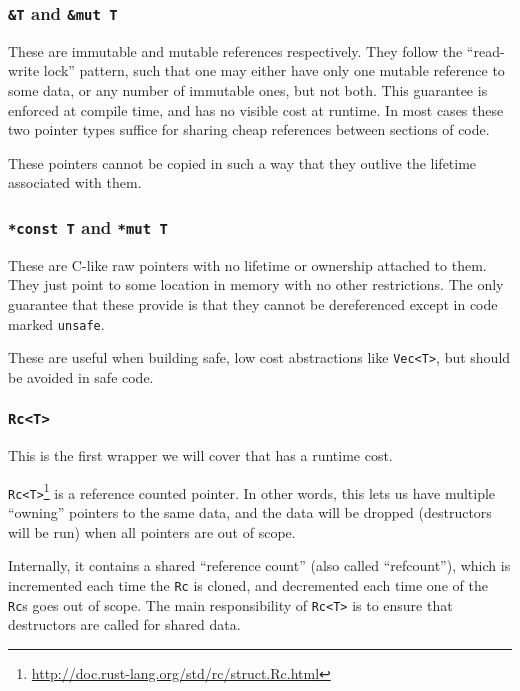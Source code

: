 \documentclass[a4paper,]{book}
\renewcommand{\href}[2]{#2\footnote{\url{#1}}}
\begin{document}
\subsubsection{\texorpdfstring{\texttt{\&T} and
\texttt{\&mut\ T}}{\&T and \&mut T}}\label{t-and-mut-t}

These are immutable and mutable references respectively. They follow the
``read-write lock'' pattern, such that one may either have only one
mutable reference to some data, or any number of immutable ones, but not
both. This guarantee is enforced at compile time, and has no visible
cost at runtime. In most cases these two pointer types suffice for
sharing cheap references between sections of code.

These pointers cannot be copied in such a way that they outlive the
lifetime associated with them.

\subsubsection{\texorpdfstring{\texttt{*const\ T} and
\texttt{*mut\ T}}{*const T and *mut T}}\label{const-t-and-mut-t}

These are C-like raw pointers with no lifetime or ownership attached to
them. They just point to some location in memory with no other
restrictions. The only guarantee that these provide is that they cannot
be dereferenced except in code marked \texttt{unsafe}.

These are useful when building safe, low cost abstractions like
\texttt{Vec\textless{}T\textgreater{}}, but should be avoided in safe
code.

\subsubsection{\texorpdfstring{\texttt{Rc\textless{}T\textgreater{}}}{Rc\textless{}T\textgreater{}}}\label{rct}

This is the first wrapper we will cover that has a runtime cost.

\href{http://doc.rust-lang.org/std/rc/struct.Rc.html}{\texttt{Rc\textless{}T\textgreater{}}}
is a reference counted pointer. In other words, this lets us have
multiple ``owning'' pointers to the same data, and the data will be
dropped (destructors will be run) when all pointers are out of scope.

Internally, it contains a shared ``reference count'' (also called
``refcount''), which is incremented each time the \texttt{Rc} is cloned,
and decremented each time one of the \texttt{Rc}s goes out of scope. The
main responsibility of \texttt{Rc\textless{}T\textgreater{}} is to
ensure that destructors are called for shared data.
\end{document}
